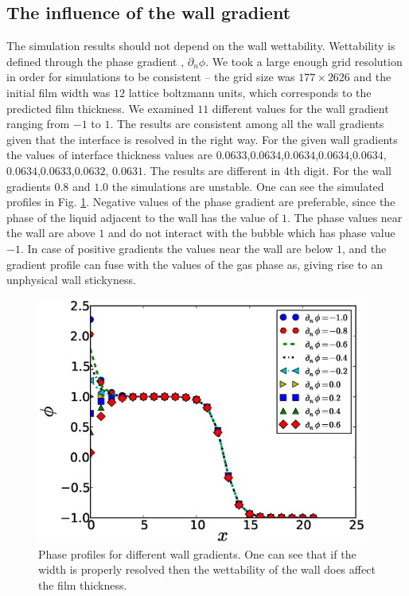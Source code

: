 \documentclass{article}
\begin{document}
\subsection{The influence of the wall gradient}
The simulation results should not depend on the wall wettability. Wettability is defined
through the phase gradient \cite{pooley-contact}, $\partial_n \phi$.  We took a large
enough grid resolution in order for simulations to be consistent -- the grid size was
$177 \times 2626$ and the initial film width was
$12$ lattice boltzmann units, which corresponds to the predicted film thickness.
We examined $11$ different values for the wall
gradient ranging from $-1$ to $1$. The results are consistent among all the
wall gradients given that the interface is resolved in the right way. For the
given wall gradients the values of interface thickness values are
$0.0633$,$0.0634$,$0.0634$,$0.0634$,$0.0634$,$0.0634$,$0.0633$,$0.0632$,
$0.0631$. The results are different in 4th digit. For the wall gradients $0.8$
and $1.0$ the
simulations are unstable. One can see the simulated profiles in Fig.
\ref{fig:gradients:profiles}. Negative values of the phase gradient are
preferable, since the phase of the liquid adjacent to the wall has the value of $1$.
The phase values near the wall are above $1$ and do not interact
with the bubble which has phase value $-1$.  In case of positive
gradients the values near the wall are below $1$, and the gradient profile can
fuse with the values of the gas phase as, giving rise to an unphysical wall stickyness.
\begin{figure}
\includegraphics[width=0.97\textwidth]{Figures/Wall/phase_grad_profiles.eps}
\caption{Phase profiles for different wall gradients. One can see that if the width
is properly resolved then the wettability of the wall does affect the film thickness.
\label{fig:gradients:profiles}
}
\end{figure}
\end{document}
